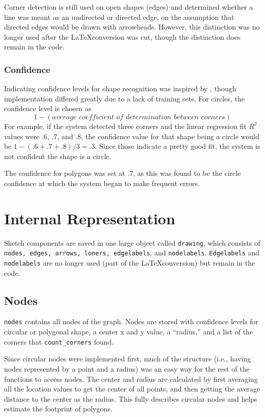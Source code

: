 \documentclass[12pt]{article}
\begin{document}
\par Corner detection is still used on open shapes (edges) and determined whether a line was meant as an undirected or directed edge, on the assumption that directed edges would be drawn with arrowheads. However, this distinction was no longer used after the \LaTeX conversion was cut, though the distinction does remain in the code.

\subsubsection{Confidence}
Indicating confidence levels for shape recognition was inspired by \cite{paleosketch}, though implementation differed greatly due to a lack of training sets. For circles, the confidence level is chosen as $$1 - (\textit{average coefficient of determination between corners})$$
For example, if the system detected three corners and the linear regression fit $R^2$ values were .6, .7, and .8, the confidence value for that shape being a circle would be $1 - (.6+.7+.8)/3 = .3$. Since those indicate a pretty good fit, the system is not confident the shape is a circle.\\

\par The confidence for polygons was set at .7, as this was found to be the circle confidence at which the system began to make frequent errors.

\section{Internal Representation}
Sketch components are saved in one large object called \texttt{drawing}, which consists of \texttt{nodes, edges, arrows, loners, edgelabels}, and \texttt{nodelabels}. \texttt{Edgelabels} and \texttt{nodelabels} are no longer used (part of the \LaTeX conversion) but remain in the code.
\subsection{Nodes}
\par \texttt{nodes} contains all nodes of the graph. Nodes are stored with confidence levels for circular or polygonal shape, a center x and y value, a ``radius,'' and a list of the corners that \texttt{count\_corners} found.\\
\par Since circular nodes were implemented first, much of the structure (i.e., having nodes represented by a point and a radius) was an easy way for the rest of the functions to access nodes. The center and radius are calculated by first averaging all the location values to get the center of all points, and then getting the average distance to the center as the radius. This fully describes circular nodes and helps estimate the footprint of polygons.
\end{document}
